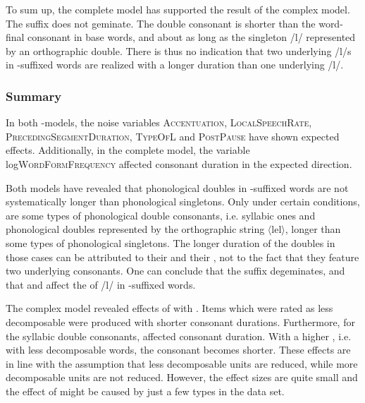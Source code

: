 To sum up, the complete model has supported the result of the complex model. The suffix  does not geminate. The double consonant is shorter than the word-final consonant in base words, and about as long as the singleton /l/ represented by an orthographic double. There is thus no indication that two underlying /l/s in -suffixed words are realized with a longer duration than one underlying /l/.




\subsubsection{Summary} \label{ly experiment summary}\largerpage

In both -models, the noise variables \textsc{Accentuation}, \textsc{LocalSpeechRate}, \textsc{PrecedingSegmentDuration}, \textsc{TypeOfL} and \textsc{PostPause} have shown expected effects. Additionally, in the complete model, the variable log\textsc{WordFormFrequency} affected consonant duration in the expected direction.

Both models have revealed that phonological doubles in -suffixed words are not systematically longer than phonological singletons. Only under certain conditions, are some types of phonological double consonants, i.e. syllabic ones and phonological doubles represented by the orthographic string $\langle$lel$\rangle$, longer than some types of phonological singletons. The longer duration of the doubles in those cases can be attributed to their  and their , not to the fact that they feature two underlying consonants. 
One can conclude that the suffix  degeminates, and that  and  affect the  of /l/ in -suffixed words. 

The complex model revealed effects of  with . Items which were rated as less decomposable were produced with shorter consonant durations. Furthermore, for the syllabic double consonants,  affected consonant duration. With a higher , i.e. with less decomposable words, the consonant becomes shorter. 
These effects are in line with the assumption that less decomposable units are reduced, while more decomposable units are not reduced. However, the effect sizes are quite small and the effect of  might be caused by just a few types in the data set. 

